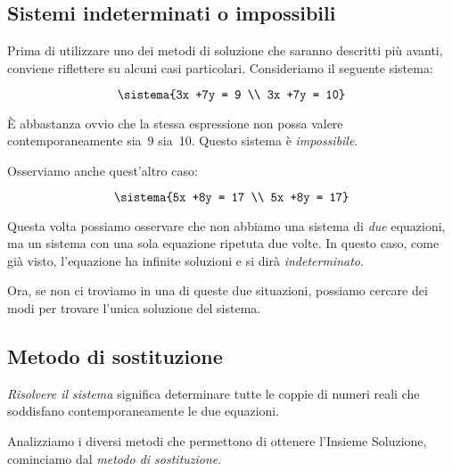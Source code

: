 \subsection{Sistemi indeterminati o impossibili}

Prima di utilizzare uno dei metodi di soluzione che saranno descritti più 
avanti, conviene riflettere su alcuni casi particolari. Consideriamo il 
seguente sistema:

\[\sistema{3x +7y = 9 \\ 3x +7y = 10}\]

È abbastanza ovvio che la stessa espressione non possa valere 
contemporaneamente sia~9 sia~10. Questo sistema è \emph{impossibile}.

Osserviamo anche quest'altro caso:

\[\sistema{5x +8y = 17 \\ 5x +8y = 17}\]

Questa volta possiamo osservare che non abbiamo una sistema di \emph{due} 
equazioni, ma un sistema con una sola equazione ripetuta due volte. In questo 
caso, come già visto, l'equazione ha infinite soluzioni e si dirà 
\emph{indeterminato}.

Ora, se non ci troviamo in una di queste due situazioni, possiamo cercare dei 
modi per trovare l'unica soluzione del sistema.

\subsection{Metodo di sostituzione}
\emph{Risolvere il sistema} significa determinare tutte le coppie di
numeri reali che soddisfano contemporaneamente le due equazioni.

Analizziamo i diversi metodi che permettono di ottenere
l'Insieme Soluzione, cominciamo dal \emph{metodo di sostituzione}.

